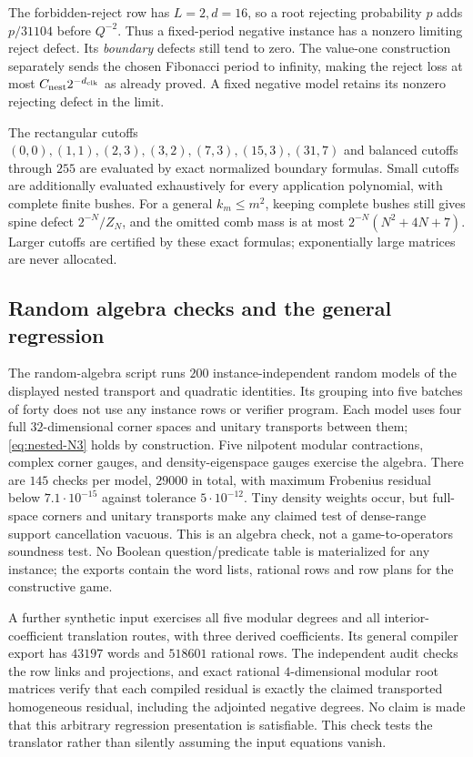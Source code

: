 The forbidden-reject row has $L=2,d=16$, so a root rejecting probability
$p$ adds $p/31104$ before $Q^{-2}$. Thus a fixed-period negative
instance has a nonzero limiting reject defect. Its \emph{boundary}
defects still tend to zero. The value-one construction separately
sends the chosen Fibonacci period to infinity, making the reject
loss at most $C_{\rm nest}2^{-{d_{\rm clk}}}$ as already proved. A fixed negative model retains its nonzero rejecting defect in the limit.

The rectangular cutoffs $(0,0),(1,1),(2,3),(3,2),(7,3),
(15,3),(31,7)$ and balanced cutoffs through $255$ are evaluated by
exact normalized boundary formulas. Small cutoffs are additionally
evaluated exhaustively for every application polynomial, with complete
finite bushes. For a general $k_m\le m^2$, keeping complete bushes
still gives spine defect $2^{-N}/Z_N$, and the omitted comb mass is
at most $2^{-N}(N^2+4N+7)$. Larger cutoffs are certified by these exact
formulas; exponentially large matrices are never allocated.

\subsection{Random algebra checks and the general regression}
The random-algebra script runs $200$ instance-independent random
models of the displayed nested transport and quadratic identities. Its grouping into five batches of
forty does not use any instance rows or verifier program. Each model
uses four full $32$-dimensional corner spaces and unitary transports
between them; \eqref{eq:nested-N3} holds by construction. Five nilpotent modular
contractions, complex corner gauges, and density-eigenspace gauges
exercise the algebra. There are $145$ checks per model, $29000$ in
total, with maximum Frobenius residual below $7.1\cdot10^{-15}$
against tolerance $5\cdot10^{-12}$. Tiny density weights occur, but
full-space corners and unitary transports make any claimed test of
dense-range support cancellation vacuous. This is an algebra check,
not a game-to-operators soundness test. No Boolean question/predicate
table is materialized for any instance; the exports contain the
word lists, rational rows and row plans for the constructive game.

A further synthetic input exercises all five modular degrees and all
interior-coefficient translation routes, with three derived coefficients.
Its general compiler export has $43197$ words and $518601$ rational
rows. The independent audit checks the row links and projections,
and exact rational $4$-dimensional modular root matrices verify that
each compiled residual is exactly the claimed transported homogeneous
residual, including the adjointed negative degrees. No claim is made
that this arbitrary regression presentation is satisfiable.
This check tests the translator rather than silently assuming the
input equations vanish.

